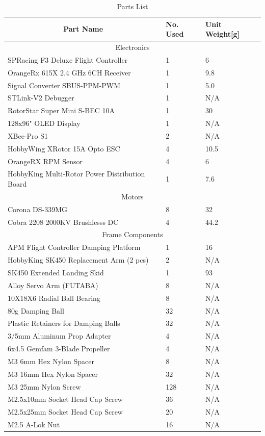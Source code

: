 \begin{table}[htbp]
\centering
\begin{tabularx}{\textwidth}{|X|l|l|}
\hline
\multicolumn{1}{|c|}{Part Name} & No. Used & Unit Weight[g]\\ \hline
\multicolumn{3}{|c|}{Electronics}\\ \hline
SPRacing F3 Deluxe Flight Controller & 1 & 6\\ \hline
OrangeRx 615X 2.4 GHz 6CH Receiver & 1 & 9.8\\ \hline
Signal Converter SBUS-PPM-PWM & 1 & 5.0\\ \hline 
STLink-V2 Debugger & 1 & N/A\\ \hline
RotorStar Super Mini S-BEC 10A & 1 & 30\\ \hline
128x96" OLED Display & 1 & N/A \\ \hline
XBee-Pro S1 & 2 & N/A \\ \hline
HobbyWing XRotor 15A Opto ESC & 4 & 10.5\\ \hline
OrangeRX RPM Sensor & 4 & 6\\ \hline
HobbyKing Multi-Rotor Power Distribution Board & 1 & 7.6\\ \hline
\multicolumn{3}{|c|}{Motors}\\ \hline
Corona DS-339MG & 8 & 32\\ \hline
Cobra 2208 2000KV Brushlesss DC & 4 & 44.2\\ \hline
\multicolumn{3}{|c|}{Frame Components}\\ \hline
APM Flight Controller Damping Platform & 1 & 16\\ \hline
HobbyKing SK450 Replacement Arm (2 pcs) & 2 & N/A\\ \hline
SK450 Extended Landing Skid & 1 & 93\\ \hline
Alloy Servo Arm (FUTABA) & 8 & N/A\\ \hline
10X18X6 Radial Ball Bearing & 8 & N/A\\ \hline
80g Damping Ball & 32 & N/A\\ \hline
Plastic Retainers for Damping Balls & 32 & N/A\\ \hline
3/5mm Aluminum Prop Adapter & 4 & N/A\\ \hline
6x4.5 Gemfam 3-Blade Propeller & 4 & N/A\\ \hline
M3 6mm Hex Nylon Spacer & 8 & N/A\\ \hline
M3 16mm Hex Nylon Spacer & 32 & N/A\\ \hline
M3 25mm Nylon Screw & 128 & N/A\\ \hline
M2.5x10mm Socket Head Cap Screw & 36 & N/A\\ \hline
M2.5x25mm Socket Head Cap Screw & 20 & N/A\\ \hline
M2.5 A-Lok Nut & 16 & N/A\\ \hline 
\end{tabularx}
\label{tab:partslist}
\caption{Parts List}
\end{table}
